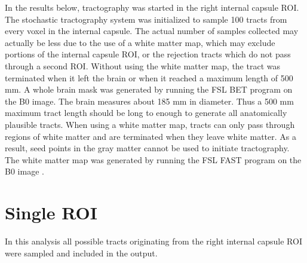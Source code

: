 In the results below, tractography was started in the right internal capsule ROI.  The stochastic tractography system was initialized to sample 100 tracts from every voxel in the internal capsule.  The actual number of samples collected may actually be less due to the use of a white matter map, which may exclude portions of the internal capsule ROI, or the rejection tracts which do not pass through a second ROI.  Without using the white matter map, the tract was terminated when it left the brain or when it reached a maximum length of 500 mm.  A whole brain mask was generated by running  the FSL BET program \cite{jenkinson05} on the B0 image.  The brain measures about 185 mm in diameter.  Thus a 500 mm maximum tract length should be long to enough to generate all anatomically plausible tracts.  When using a white matter map, tracts can only pass through regions of white matter and are terminated when they leave white matter.  As a result, seed points in the gray matter cannot be used to initiate tractography.  The white matter map was generated by running the FSL FAST program on the B0 image \cite{zhang01}.

\section{Single ROI}
In this analysis all possible tracts originating from the right internal capsule ROI were sampled and included in the output.


